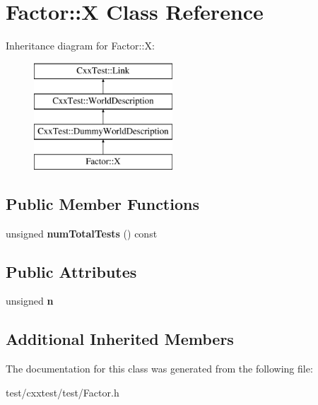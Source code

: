 \hypertarget{classFactor_1_1X}{\section{Factor\-:\-:X Class Reference}
\label{classFactor_1_1X}
}
Inheritance diagram for Factor\-:\-:X\-:\begin{figure}[H]
\begin{center}
\leavevmode
\includegraphics[height=4.000000cm]{classFactor_1_1X}
\end{center}
\end{figure}
\subsection*{Public Member Functions}
\begin{DoxyCompactItemize}
\item 
\hypertarget{classFactor_1_1X_a66c250ebb450bb2b873f4d6ec8b7e4cc}{unsigned {\bfseries num\-Total\-Tests} () const }\label{classFactor_1_1X_a66c250ebb450bb2b873f4d6ec8b7e4cc}

\end{DoxyCompactItemize}
\subsection*{Public Attributes}
\begin{DoxyCompactItemize}
\item 
\hypertarget{classFactor_1_1X_a70a99bee7aac04e5d26b2925a628cdf5}{unsigned {\bfseries n}}\label{classFactor_1_1X_a70a99bee7aac04e5d26b2925a628cdf5}

\end{DoxyCompactItemize}
\subsection*{Additional Inherited Members}


The documentation for this class was generated from the following file\-:\begin{DoxyCompactItemize}
\item 
test/cxxtest/test/Factor.\-h\end{DoxyCompactItemize}

